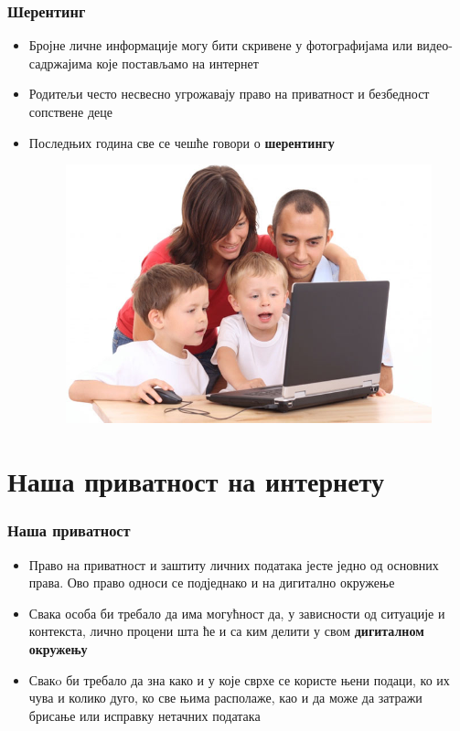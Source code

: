 \documentclass{beamer}
\begin{document}
\begin{frame}[fragile]\frametitle{Шерентинг}
	\begin{itemize}	
		\item Бројне личне информације могу бити скривене у фотографијама или видео-садржајима које постављамо на интернет 
		\item Родитељи често несвесно угрожавају право на приватност и безбедност сопствене деце
		\item Последњих година све се чешће говори о \textbf{шерентингу}
		
		\begin{figure}[h!]
\begin{center}
\includegraphics[scale=0.20]{dd.jpg}
\end{center}
\end{figure}
	\end{itemize}
\end{frame}


\section{Наша приватност на интернету}

\begin{frame}[fragile]\frametitle{Наша приватност}
	\begin{itemize}	
		\item Право на приватност и заштиту личних података јесте једно од основних права. Ово право односи се подједнако и на дигитално окружење
		\item Свака особа би требало да има могућност да, у зависности од ситуације и контекста, лично процени шта ће и са ким делити у свом \textbf{дигиталном окружењу}
		\item Свакo би требало да зна како и у које сврхе се користе њени подаци, ко их чува и колико дуго, ко све њима располаже, као и да може да затражи брисање или исправку нетачних података
	\end{itemize}
\end{frame}
\end{document}
